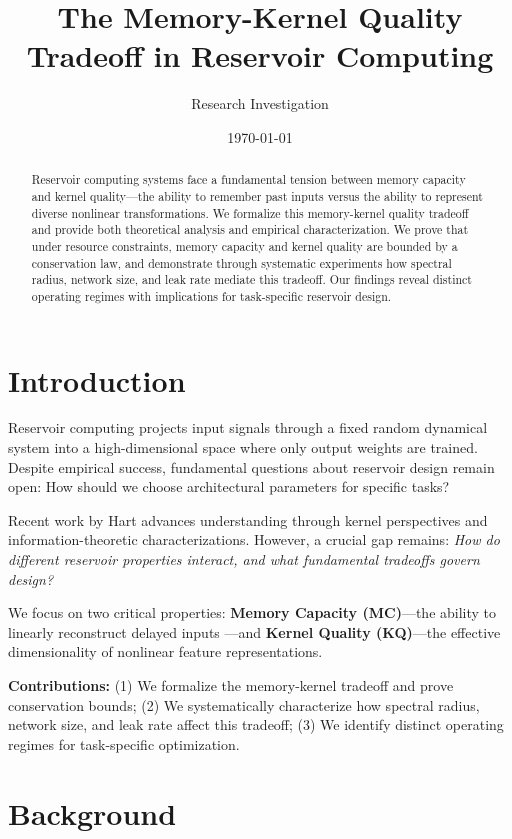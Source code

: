 \documentclass[11pt]{article}
\title{\textbf{The Memory-Kernel Quality Tradeoff in Reservoir Computing}}
\author{Research Investigation}
\date{\today}
\begin{document}
\maketitle

\begin{abstract}
Reservoir computing systems face a fundamental tension between memory capacity and kernel quality—the ability to remember past inputs versus the ability to represent diverse nonlinear transformations. We formalize this memory-kernel quality tradeoff and provide both theoretical analysis and empirical characterization. We prove that under resource constraints, memory capacity and kernel quality are bounded by a conservation law, and demonstrate through systematic experiments how spectral radius, network size, and leak rate mediate this tradeoff. Our findings reveal distinct operating regimes with implications for task-specific reservoir design.
\end{abstract}

\section{Introduction}

Reservoir computing \cite{jaeger2001echo,maass2002real} projects input signals through a fixed random dynamical system into a high-dimensional space where only output weights are trained. Despite empirical success, fundamental questions about reservoir design remain open: How should we choose architectural parameters for specific tasks?

Recent work by Hart \cite{hart2023reservoir,hart2024information} advances understanding through kernel perspectives and information-theoretic characterizations. However, a crucial gap remains: \textit{How do different reservoir properties interact, and what fundamental tradeoffs govern design?}

We focus on two critical properties: \textbf{Memory Capacity (MC)}—the ability to linearly reconstruct delayed inputs \cite{jaeger2001short}—and \textbf{Kernel Quality (KQ)}—the effective dimensionality of nonlinear feature representations.

\textbf{Contributions:} (1) We formalize the memory-kernel tradeoff and prove conservation bounds; (2) We systematically characterize how spectral radius, network size, and leak rate affect this tradeoff; (3) We identify distinct operating regimes for task-specific optimization.

\section{Background}
\end{document}
